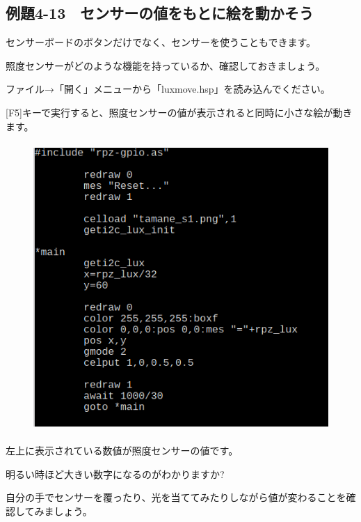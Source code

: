 \newpage
\subsection{例題4-13　センサーの値をもとに絵を動かそう}

\begin{description}
    \item {}
\end{description}

センサーボードのボタンだけでなく、センサーを使うこともできます。

照度センサーがどのような機能を持っているか、確認しておきましょう。


ファイル→「開く」メニューから「luxmove.hsp」を読み込んでください。

[F5]キーで実行すると、照度センサーの値が表示されると同時に小さな絵が動きます。

\begin{figure}[H]
    \begin{center}
      \includegraphics[keepaspectratio,width=11.615cm,height=10.94cm]{text04-img/s_luxmovesrc.png}
    \end{center}
    \label{fig:prog_menu}
\end{figure}

左上に表示されている数値が照度センサーの値です。

明るい時ほど大きい数字になるのがわかりますか?

自分の手でセンサーを覆ったり、光を当ててみたりしながら値が変わることを確認してみましょう。

